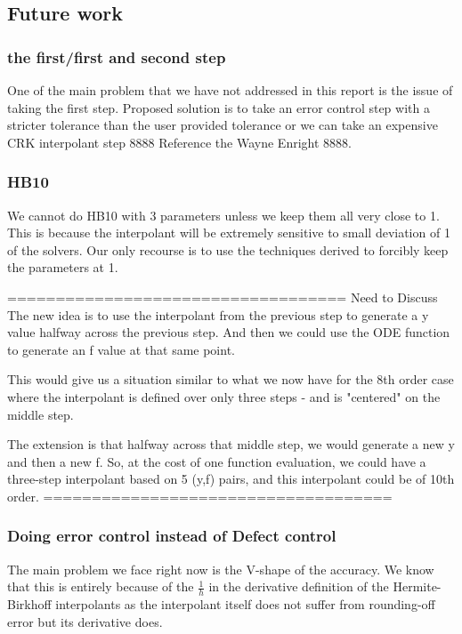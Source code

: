 \documentclass{article}
\begin{document}
\subsection{Future work}
\subsubsection{the first/first and second step}
One of the main problem that we have not addressed in this report is the issue of taking the first step. Proposed solution is to  take an error control step with a stricter tolerance than the user provided tolerance or we can take an expensive CRK interpolant step 8888 Reference the Wayne Enright 8888.

\subsubsection{HB10}
We cannot do HB10 with 3 parameters unless we keep them all very close to 1. This is because the interpolant will be extremely sensitive to small deviation of 1 of the solvers.
Our only recourse is to use the techniques derived to forcibly keep the parameters at 1. 

===================================
Need to Discuss
The new idea is to use the interpolant from the previous step to generate
a y value halfway across the previous step. And then we could
use the ODE function to generate an f value at that same point.

This would give us a situation similar to what we now have for the
8th order case where the interpolant is defined over only three
steps - and is "centered" on the middle step.

The extension is that halfway across that middle step, we would
generate a new y and then a new f. So, at the cost of one
function evaluation, we could have a three-step interpolant
based on 5 (y,f)  pairs, and this interpolant could be of 10th order.
====================================

\subsubsection{Doing error control instead of Defect control}
The main problem we face right now is the V-shape of the accuracy. We know that this is entirely because of the $\frac{1}{h}$ in the derivative definition of the Hermite-Birkhoff interpolants as the interpolant itself does not suffer from rounding-off error but its derivative does.
\end{document}
